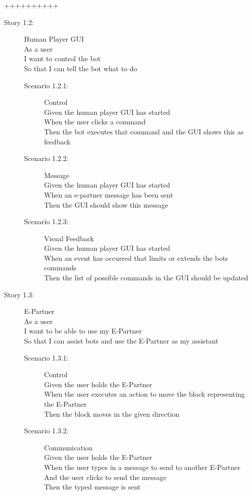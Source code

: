 ++++++++++\documentclass{article}
\begin{document}
\begin{description}
	\item[Story 1.2:] Human Player GUI\\
	As a user \\
	I want to control the bot\\
	So that I can tell the bot what to do

	\begin{description}
		\item[Scenario 1.2.1:] Control\\
		Given the human player GUI has started\\
		When the user clicks a command\\
		Then the bot executes that command and the GUI shows this as feedback

		\item[Scenario 1.2.2:] Message\\
		Given the human player GUI has started\\
		When an e-partner message has been sent\\
		Then the GUI should show this message

		\item[Scenario 1.2.3:] Visual Feedback\\
		Given the human player GUI has started\\
		When an event has occurred that limits or extends the bots commands\\
		Then the list of possible commands in the GUI should be updated
	\end{description}
\end{description}
\begin{description}
	\item[Story 1.3:] E-Partner\\
	As a user\\
	I want to be able to use my E-Partner\\
	So that I can assist bots and use the E-Partner as my assistant

	\begin{description}
		\item[Scenario 1.3.1:] Control\\
		Given the user holds the E-Partner\\
		When the user executes an action to move the block representing the E-Partner\\
		Then the block moves in the given direction
		
		\item[Scenario 1.3.2:] Communication\\
		Given the user holds the E-Partner\\
		When the user types in a message to send to another E-Partner\\
		And the user clicks to send the message\\
		Then the typed message is sent
	\end{description}
\end{description}
\end{document}
